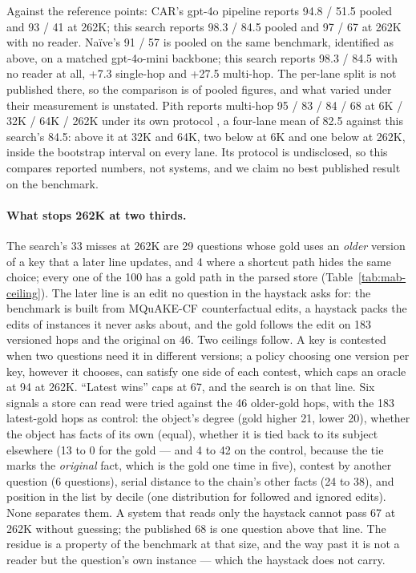 \documentclass[11pt]{article}
\begin{document}
Against the reference points: CAR's gpt-4o pipeline reports 94.8 / 51.5
pooled and 93 / 41 at 262K; this search reports 98.3 / 84.5 pooled and
97 / 67 at 262K with no reader. Na\"ive's 91 / 57 is pooled on the same
benchmark, identified as above, on a matched gpt-4o-mini backbone; this search
reports 98.3 / 84.5 with no reader at all, +7.3 single-hop and +27.5 multi-hop.
The per-lane split is not published there, so the comparison is of pooled figures,
and what varied under their measurement is unstated. Pith
reports multi-hop 95 / 83 / 84 / 68 at 6K / 32K / 64K / 262K under its own
protocol \cite{pith}, a four-lane mean of 82.5 against this search's 84.5:
above it at 32K and 64K, two below at 6K and one below at 262K, inside the
bootstrap interval on every lane. Its protocol is undisclosed, so this
compares reported numbers, not systems, and we claim no best published
result on the benchmark.

\paragraph{What stops 262K at two thirds.} The search's 33 misses at 262K
are 29 questions whose gold uses an \emph{older} version of a key that a
later line updates, and 4 where a shortcut path hides the same choice;
every one of the 100 has a gold path in the parsed store
(Table~\ref{tab:mab-ceiling}). The later line is an edit no question in the
haystack asks for: the benchmark is built from MQuAKE-CF counterfactual
edits, a haystack packs the edits of instances it never asks about, and the
gold follows the edit on 183 versioned hops and the original on 46. Two
ceilings follow. A key is contested when two questions need it in different
versions; a policy choosing one version per key, however it chooses, can
satisfy one side of each contest, which caps an oracle at 94 at 262K.
``Latest wins'' caps at 67, and the search is on that line. Six signals a
store can read were tried against the 46 older-gold hops, with the 183
latest-gold hops as control: the object's degree (gold higher 21, lower
20), whether the object has facts of its own (equal), whether it is tied
back to its subject elsewhere (13 to 0 for the gold --- and 4 to 42 on the
control, because the tie marks the \emph{original} fact, which is the gold
one time in five), contest by another question (6 questions), serial
distance to the chain's other facts (24 to 38), and position in the list by
decile (one distribution for followed and ignored edits). None separates
them. A system that reads only the haystack cannot pass 67 at 262K without
guessing; the published 68 is one question above that line. The residue is
a property of the benchmark at that size, and the way past it is not a
reader but the question's own instance --- which the haystack does not
carry.
\end{document}
